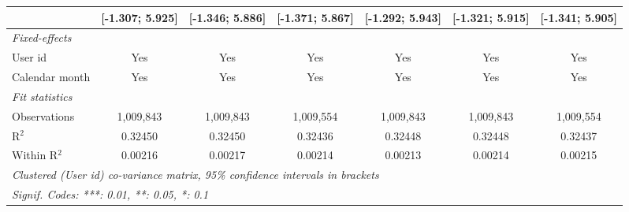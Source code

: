 \begin{table}[htbp]
\begin{threeparttable}[b]
\begin{tabular}{lcccccc}
                                        & [-1.307; 5.925]  & [-1.346; 5.886]  & [-1.371; 5.867]  & [-1.292; 5.943]  & [-1.321; 5.915]  & [-1.341; 5.905]\\   
         \midrule
         \emph{Fixed-effects}\\
         User id                        & Yes              & Yes              & Yes              & Yes              & Yes              & Yes\\  
         Calendar month                 & Yes              & Yes              & Yes              & Yes              & Yes              & Yes\\  
         \midrule
         \emph{Fit statistics}\\
         Observations                   & 1,009,843        & 1,009,843        & 1,009,554        & 1,009,843        & 1,009,843        & 1,009,554\\  
         R$^2$                          & 0.32450          & 0.32450          & 0.32436          & 0.32448          & 0.32448          & 0.32437\\  
         Within R$^2$                   & 0.00216          & 0.00217          & 0.00214          & 0.00213          & 0.00214          & 0.00215\\  
         \midrule \midrule
         \multicolumn{7}{l}{\emph{Clustered (User id) co-variance matrix, 95\% confidence intervals in brackets}}\\
         \multicolumn{7}{l}{\emph{Signif. Codes: ***: 0.01, **: 0.05, *: 0.1}}\\
      \end{tabular}
   \end{threeparttable}
\end{table}


